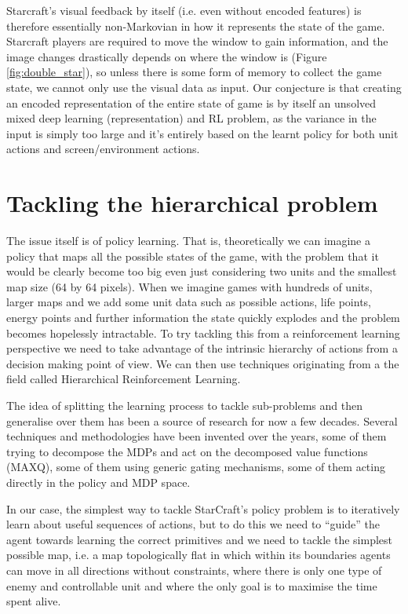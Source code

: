 Starcraft’s visual feedback by itself (i.e. even without encoded features) is
therefore essentially non-Markovian in how it represents the state of the game.
Starcraft players are required to move the window to gain information, and the
image changes drastically depends on where the window is (Figure
\ref{fig:double_star}), so unless there is some form of memory to collect the
game state, we cannot only use the visual data as input. Our conjecture is that
creating an encoded representation of the entire state of game is by itself an
unsolved mixed deep learning (representation) and RL problem, as the variance in
the input is simply too large and it's entirely based on the learnt policy for
both unit actions and screen/environment actions.

\section{Tackling the hierarchical problem}

The issue itself is of policy learning. That is, theoretically we can imagine a
policy that maps all the possible states of the game, with the problem that it
would be clearly become too big even just considering two units and the smallest
map size (64 by 64 pixels). When we imagine games with hundreds of units, larger
maps and we add some unit data such as possible actions, life points, energy
points and further information the state quickly explodes and the problem
becomes hopelessly intractable. To try tackling this from a reinforcement
learning perspective we need to take advantage of the intrinsic hierarchy of
actions from a decision making point of view. We can then use techniques
originating from a the field called Hierarchical Reinforcement Learning.

The idea of splitting the learning process to tackle sub-problems and then
generalise over them has been a source of research for now a few decades.
Several techniques and methodologies have been invented over the years, some of
them trying to decompose the MDPs\cite{marthi2005concurrent} and act on the
decomposed value functions (MAXQ)\cite{dietterich2000hierarchical}, some of them
using generic gating mechanisms\cite{watkins1989learning}, some of them acting
directly in the policy and MDP space\cite{stolle2002learning}.

In our case, the simplest way to tackle StarCraft's policy problem is to
iteratively learn about useful sequences of actions, but to do this we need to
``guide'' the agent towards learning the correct primitives and we need to
tackle the simplest possible map, i.e. a map topologically flat in which within
its boundaries agents can move in all directions without constraints, where
there is only one type of enemy and controllable unit and where the only goal is
to maximise the time spent alive.

